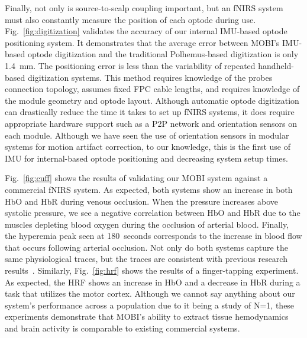 Finally, not only is source-to-scalp coupling important, but an fNIRS system must also constantly measure the position of each optode during use. Fig.~\ref{fig:digitization} validates the accuracy of our internal IMU-based optode positioning system. It demonstrates that the average error between MOBI's IMU-based optode digitization and the traditional Polhemus-based digitization is only 1.4~mm. The positioning error is less than the variability of repeated handheld-based digitization systems. This method requires knowledge of the probes connection topology, assumes fixed FPC cable lengths, and requires knowledge of the module geometry and optode layout. Although automatic optode digitization can drastically reduce the time it takes to set up fNIRS systems, it does require appropriate hardware support such as a P2P network and orientation sensors on each module. Although we have seen the use of orientation sensors in modular systems for motion artifact correction, to our knowledge, this is the first use of IMU for internal-based optode positioning and decreasing system setup times.

Fig.~\ref{fig:cuff} shows the results of validating our MOBI system against a commercial fNIRS system. As expected, both systems show an increase in both HbO and HbR during venous occlusion. When the pressure increases above systolic pressure, we see a negative correlation between HbO and HbR due to the muscles depleting blood oxygen during the occlusion of arterial blood. Finally, the hyperemia peak seen at 180~seconds corresponds to the increase in blood flow that occurs following arterial occlusion. Not only do both systems capture the same physiological traces, but the traces are consistent with previous research results~\cite{Liu2022}. Similarly, Fig.~\ref{fig:hrf} shows the results of a finger-tapping experiment. As expected, the HRF shows an increase in HbO and a decrease in HbR during a task that utilizes the motor cortex. Although we cannot say anything about our system's performance across a population due to it being a study of N=1, these experiments demonstrate that MOBI's ability to extract tissue hemodynamics and brain activity is comparable to existing commercial systems. 

